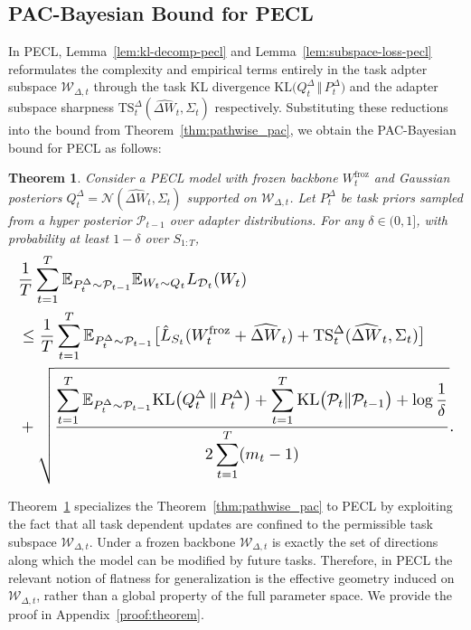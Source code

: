 \documentclass{article}
\theoremstyle{plain}
\newtheorem{theorem}{Theorem}[section]
\theoremstyle{definition}
\theoremstyle{remark}
\begin{document}
\subsection{PAC-Bayesian Bound for PECL}

In PECL, Lemma~\ref{lem:kl-decomp-pecl} and Lemma~\ref{lem:subspace-loss-pecl} reformulates the complexity and empirical terms entirely in the task adpter subspace $\mathcal W_{\Delta,t}$ through the task KL divergence $\mathrm{KL}\bigl(Q_t^\Delta \,\Vert\, P_t^\Delta\bigr)$ and the adapter subspace sharpness $\mathrm{TS}_t^{\Delta}(\widehat{\Delta W}_t,\Sigma_t)$ respectively. 
Substituting these reductions into the bound from Theorem~\ref{thm:pathwise_pac}, we obtain the PAC-Bayesian bound for PECL as follows:
\begin{theorem}
\label{thm:pecl-bound}
Consider a PECL model with frozen backbone $W^{\mathrm{froz}}_t$ and Gaussian posteriors 
$Q_t^\Delta = \mathcal N(\widehat{\Delta W}_t,\Sigma_t)$ supported on $\mathcal W_{\Delta,t}$. 
Let $P_t^\Delta$ be task priors sampled from a hyper posterior $\mathcal P_{t-1}$ over adapter 
distributions. For any $\delta\in(0,1]$, with probability at least $1-\delta$ over $S_{1:T}$,
{%
\setlength{\abovedisplayskip}{2pt}
\setlength{\belowdisplayskip}{3pt}
\setlength{\abovedisplayshortskip}{3pt}
\setlength{\belowdisplayshortskip}{3pt}
\begin{equation*}
\label{eq:pecl-main-bound}
\resizebox{\linewidth}{!}{$
\begin{aligned}
&\frac{1}{T}\sum_{t=1}^T
\mathbb E_{P_t^\Delta\sim\mathcal P_{t-1}}
\mathbb E_{W_t\sim Q_t}
L_{\mathcal D_t}(W_t) \\
&\le
\frac{1}{T}\sum_{t=1}^T
\mathbb E_{P_t^\Delta\sim\mathcal P_{t-1}}
\bigl[
\hat L_{S_t}(W^{\mathrm{froz}}_t + \widehat{\Delta W}_t)
+
\mathrm{TS}_t^{\Delta}(\widehat{\Delta W}_t,\Sigma_t)
\bigr] \\
&+
\sqrt{
\frac{
\displaystyle
\sum_{t=1}^T
\mathbb E_{P_t^\Delta\sim\mathcal P_{t-1}}
\mathrm{KL}\bigl(Q_t^\Delta \,\Vert\, P_t^\Delta\bigr)
+
\sum_{t=1}^T
\mathrm{KL}\bigl(\mathcal P_t\Vert\mathcal P_{t-1}\bigr)
+
\log\frac{1}{\delta}}
{2\displaystyle\sum_{t=1}^T (m_t - 1)}
}.
\end{aligned}
$}
\end{equation*}
}
\end{theorem}
Theorem~\ref{thm:pecl-bound} specializes the Theorem~\ref{thm:pathwise_pac} to PECL by exploiting the fact that all task dependent updates are confined to the permissible task subspace $\mathcal W_{\Delta,t}$. 
Under a frozen backbone $\mathcal W_{\Delta,t}$ is exactly the set of directions along which the model can be modified by future tasks.
Therefore, in PECL the relevant notion of flatness for generalization is the effective geometry induced on $\mathcal W_{\Delta,t}$, rather than a global property of the full parameter space. We provide the proof in Appendix~\ref{proof:theorem}.
\end{document}
